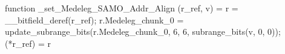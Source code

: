 function _set_Medeleg_SAMO_Addr_Align (r_ref, v) = {
    r = __bitfield_deref(r_ref);
    r.Medeleg_chunk_0 = update_subrange_bits(r.Medeleg_chunk_0, 6, 6, subrange_bits(v, 0, 0));
    (*r_ref) = r
}
